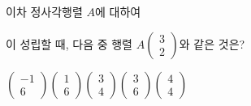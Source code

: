 이차 정사각행렬 $A$에 대하여 \par\smallskip{}\par\smallskip\noindent 이 성립할 때, 다음 중 행렬 $A\begin{pmatrix} 3 \\ 2 \end{pmatrix}$와 같은 것은?
\begin{choicesii}{$\begin{pmatrix} -1 \\ 6 \end{pmatrix}$}{$\begin{pmatrix} 1 \\ 6 \end{pmatrix}$}{$\begin{pmatrix} 3 \\ 4 \end{pmatrix}$}{$\begin{pmatrix} 3 \\ 6 \end{pmatrix}$}{$\begin{pmatrix} 4 \\ 4 \end{pmatrix}$}\end{choicesii}
